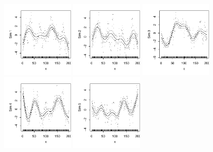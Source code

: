 \documentclass[12pt, a4paper,  BCOR=8.25mm, DIV=15]{scrartcl}\usepackage[]{graphicx}\usepackage[]{color}
\newenvironment{knitrout}{}{} %
\begin{document}
\begin{figure}
\begin{knitrout}
\color{fgcolor}

{\centering \includegraphics[width=0.32\textwidth]{figs/xmeth-arima-sim-12_7-1} 
\includegraphics[width=0.32\textwidth]{figs/xmeth-arima-sim-12_7-2} 
\includegraphics[width=0.32\textwidth]{figs/xmeth-arima-sim-12_7-3} 
\includegraphics[width=0.32\textwidth]{figs/xmeth-arima-sim-12_7-4} 
\includegraphics[width=0.32\textwidth]{figs/xmeth-arima-sim-12_7-5} 
}
\end{knitrout}
\end{figure}
\end{document}
